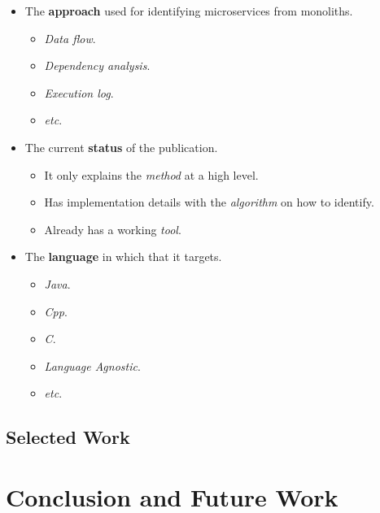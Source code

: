 \documentclass[conference]{IEEEtran}
\begin{document}
\begin{itemize}
  \item The \textbf{approach} used for identifying microservices from monoliths.
  \begin{itemize}
    \item \textit{Data flow}.
    \item \textit{Dependency analysis}.
    \item \textit{Execution log}.
    \item \textit{etc}.
  \end{itemize}
  \item The current \textbf{status} of the publication.
  \begin{itemize}
    \item It only explains the \textit{method} at a high level.
    \item Has implementation details with the \textit{algorithm} on how to identify.
    \item Already has a working \textit{tool}.
  \end{itemize}
  \item The \textbf{language} in which that it targets.
  \begin{itemize}
    \item \textit{Java}.
    \item \textit{Cpp}.
    \item \textit{C}.
    \item \textit{Language Agnostic}.
    \item \textit{etc}.
  \end{itemize}
\end{itemize}


\subsection{Selected Work}



\section{Conclusion and Future Work}
\end{document}

